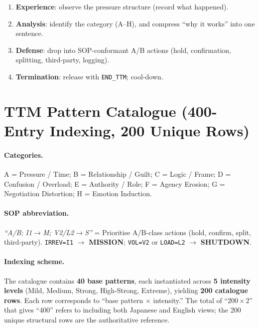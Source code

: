 \begin{enumerate}
\item \textbf{Experience}: observe the pressure structure (record
what happened).
\item \textbf{Analysis}: identify the category (A--H), and compress
``why it works'' into one sentence.
\item \textbf{Defense}: drop into SOP-conformant A/B actions
(hold, confirmation, splitting, third-party, logging).
\item \textbf{Termination}: release with \texttt{END\_TTM};
cool-down.
\end{enumerate}

\section{TTM Pattern Catalogue (400-Entry Indexing, 200 Unique Rows)}
\label{sec:ttm-catalog}


\paragraph{Categories.}
A = Pressure / Time;
B = Relationship / Guilt;
C = Logic / Frame;
D = Confusion / Overload;
E = Authority / Role;
F = Agency Erosion;
G = Negotiation Distortion;
H = Emotion Induction.

\paragraph{SOP abbreviation.}
\textit{``A/B; I1$\to$M; V2/L2$\to$S''} = Prioritise A/B-class actions
(hold, confirm, split, third-party). \texttt{IRREV=I1} $\to$
\textbf{MISSION}; \texttt{VOL=V2} or \texttt{LOAD=L2} $\to$
\textbf{SHUTDOWN}.

\paragraph{Indexing scheme.}
The catalogue contains \textbf{40 base patterns}, each instantiated
across \textbf{5 intensity levels} (Mild, Medium, Strong,
High-Strong, Extreme), yielding \textbf{200 catalogue rows}. Each
row corresponds to ``base pattern $\times$ intensity.'' The total of
``$200 \times 2$'' that gives ``400'' refers to including both
Japanese and English views; the 200 unique structural rows are the
authoritative reference.

